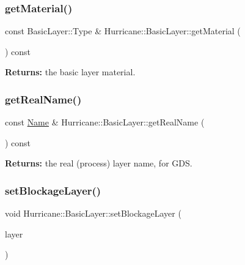 \subsubsection{\texorpdfstring{get\+Material()}{getMaterial()}}
{\footnotesize\ttfamily const Basic\+Layer\+::\+Type \& Hurricane\+::\+Basic\+Layer\+::get\+Material (\begin{DoxyParamCaption}{ }\end{DoxyParamCaption}) const\hspace{0.3cm}{\ttfamily [inline]}}

{\bfseries Returns\+:} the basic layer material. \mbox{\label{classHurricane_1_1BasicLayer_aaae9fcd776eb83407b4566614eafc41f}} 
\subsubsection{\texorpdfstring{get\+Real\+Name()}{getRealName()}}
{\footnotesize\ttfamily const \mbox{\hyperlink{classHurricane_1_1Name}{Name}} \& Hurricane\+::\+Basic\+Layer\+::get\+Real\+Name (\begin{DoxyParamCaption}{ }\end{DoxyParamCaption}) const\hspace{0.3cm}{\ttfamily [inline]}}

{\bfseries Returns\+:} the real (process) layer name, for G\+DS. \mbox{\label{classHurricane_1_1BasicLayer_a766c6dc1120de2066b15411861f5d4f8}} 
\subsubsection{\texorpdfstring{set\+Blockage\+Layer()}{setBlockageLayer()}}
{\footnotesize\ttfamily void Hurricane\+::\+Basic\+Layer\+::set\+Blockage\+Layer (\begin{DoxyParamCaption}\item[{\mbox{\hyperlink{classHurricane_1_1BasicLayer}{Basic\+Layer}} $\ast$}]{layer }\end{DoxyParamCaption})\hspace{0.3cm}{\ttfamily [inline]}}

